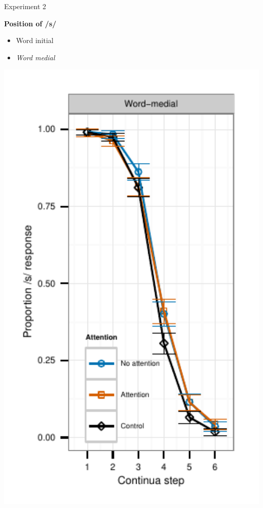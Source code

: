 \documentclass{beamer}
\begin{document}
\begin{frame}{Experiment 2}
\begin{minipage}{0.45\textwidth}
\textbf{Position of /s/}
\begin{itemize}
\item Word initial
\item \emph{Word medial}
\end{itemize}
\end{minipage}
\hfill
\begin{minipage}{0.4\textwidth}
\includegraphics[width=1.0\textwidth]{graphs/exp2_categresults_present2-final}
\end{minipage}

\end{frame}
\end{document}
